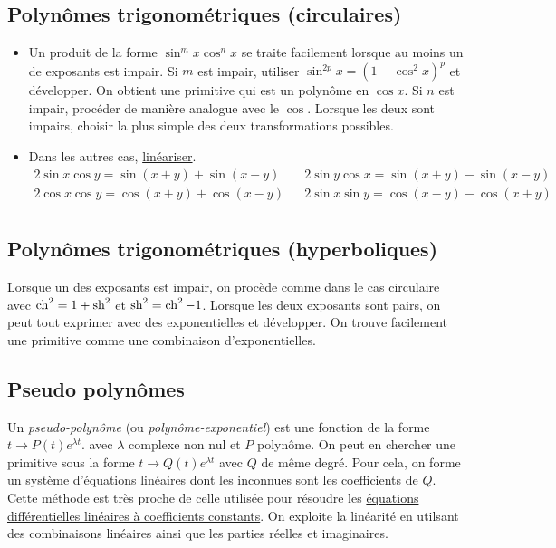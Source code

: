 \subsection{Polynômes trigonométriques (circulaires)}
\begin{itemize}
 \item Un produit de la forme $\sin^mx\cos^nx$ se traite facilement lorsque au moins un de exposants est impair.\newline
Si $m$ est impair, utiliser $\sin^{2p}x = (1-\cos^2x)^p$ et développer. On obtient une primitive qui est un polynôme en $\cos x$.\newline
Si $n$ est impair, procéder de manière analogue avec le $\cos$. Lorsque les deux sont impairs, choisir la plus simple des deux transformations possibles.
\item Dans les autres cas, \href{\baseurl C2004.pdf}{linéariser}.
\begin{align*}
 2\sin x \cos y = \sin(x+y)+\sin(x-y) & & 2\sin y \cos x = \sin(x+y) - \sin(x-y) \\
2\cos x \cos y = \cos(x+y)+\cos(x-y) & & 2\sin x \sin y = \cos(x-y) - \cos(x+y) \\
\end{align*}
\end{itemize}

\subsection{Polynômes trigonométriques (hyperboliques)}
Lorsque un des exposants est impair, on procède comme dans le cas circulaire avec $\mathop{\mathrm{ch}}^2 = 1 +\mathop{\mathrm{sh}}^2$ et $\mathop{\mathrm{sh}}^2 = \mathop{\mathrm{ch}}^2 -1$.\newline
Lorsque les deux exposants sont pairs, on peut tout exprimer avec des exponentielles et développer. On trouve facilement une primitive comme une combinaison d'exponentielles.

\subsection{Pseudo polynômes}
Un \emph{pseudo-polynôme} (ou \emph{polynôme-exponentiel}) est une fonction de la forme $t\rightarrow P(t)e^{\lambda t}$. avec $\lambda$ complexe non nul et $P$ polynôme.\newline
On peut en chercher une primitive sous la forme $t\rightarrow Q(t)e^{\lambda t}$ avec $Q$ de même degré. Pour cela, on forme un système d'équations linéaires dont les inconnues sont les coefficients de $Q$. Cette méthode est très proche de celle utilisée pour résoudre les \href{\baseurl C1616.pdf}{équations différentielles linéaires à coefficients constants}. On exploite la linéarité en utilsant des combinaisons linéaires ainsi que les parties réelles et imaginaires.
